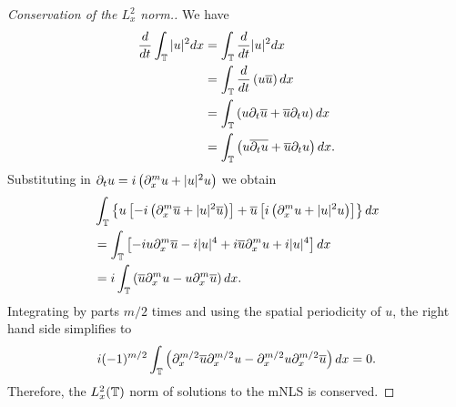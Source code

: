 \begin{proof}[Conservation of the $L_x^2$ norm.] 
We have
%
%
\begin{equation*}
	\begin{split}
		\frac{d}{dt} \int_{\mathbb{T}} | u |^2  dx
		& = \int_{\mathbb{T}} \frac{d}{dt} | u |^2  dx
		\\
		& = \int_{\mathbb{T}} \frac{d}{dt} \left( u \overline{u} \right)  dx
		\\
		& = \int_{\mathbb{T}} \left( u \partial_t \overline{u} + \overline{u} \partial_t u \right) dx
		\\
		& = \int_{\mathbb{T}} \left( u \overline{\partial_t u} + \overline{u} \partial_t u \right)dx.
	\end{split}
\end{equation*}
%
%
Substituting in $\partial_t u = i\left( \partial_x^{m} u + | u |^2 u \right)$ we obtain
%
%
\begin{equation*}
	\begin{split}
		& \int_{\mathbb{T}} \left\{ u\left[ -i\left( \partial_x^{m} \overline{u} + | u |^2
		\overline{u} \right) \right] + \overline{u}\left[ i\left( \partial_x^{m} u + | u
		|^2 u \right) \right] \right\}dx
		\\
		& = \int_{\mathbb{T}} \left[ -iu \partial_x^{m} \overline{u} - i| u |^4 + i \overline{u}
		\partial_x^{m} u + i | u |^4 \right]dx
		\\
		& = i \int_{\mathbb{T}}\left( \overline{u} \partial_x^{m} u - u \partial_x^{m } \overline{u}
		\right)dx.
	\end{split}
\end{equation*}
%
%
Integrating by parts $m/2$ times and using
the spatial periodicity of $u$, the right
hand side simplifies to
%
%
\begin{equation*}
	\begin{split}
    i (-1)^{m/2}\int_{\mathbb{T}} \left( \partial_x^{m/2} \overline{u} \partial_x^{m/2} u - \partial_x^{m/2} u
		\partial_x^{m/2 } 
		\overline{u} \right) dx = 0.
	\end{split}
\end{equation*}
%
%
Therefore, the $L_x^2(\mathbb{T})$ norm of solutions to the mNLS is conserved. 
\end{proof}
%
%
